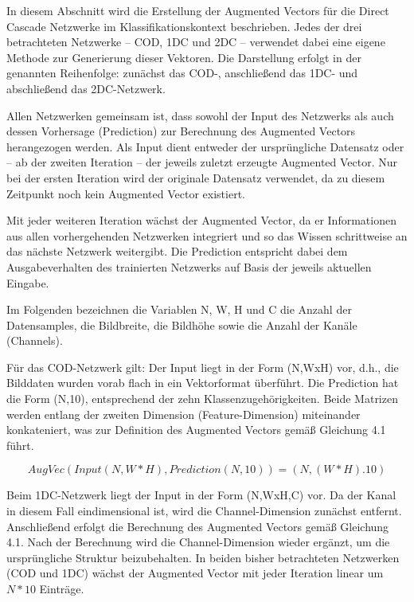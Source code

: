 In diesem Abschnitt wird die Erstellung der Augmented Vectors für die Direct Cascade Netzwerke im Klassifikationskontext beschrieben. Jedes der 
drei betrachteten Netzwerke – COD, 1DC und 2DC – verwendet dabei eine eigene Methode zur Generierung dieser Vektoren. Die Darstellung erfolgt in 
der genannten Reihenfolge: zunächst das COD-, anschließend das 1DC- und abschließend das 2DC-Netzwerk.

Allen Netzwerken gemeinsam ist, dass sowohl der Input des Netzwerks als auch dessen Vorhersage (Prediction) zur Berechnung des Augmented Vectors 
herangezogen werden. Als Input dient entweder der ursprüngliche Datensatz oder – ab der zweiten Iteration – der jeweils zuletzt erzeugte Augmented 
Vector. Nur bei der ersten Iteration wird der originale Datensatz verwendet, da zu diesem Zeitpunkt noch kein Augmented Vector existiert.

Mit jeder weiteren Iteration wächst der Augmented Vector, da er Informationen aus allen vorhergehenden Netzwerken integriert und so das Wissen 
schrittweise an das nächste Netzwerk weitergibt. Die Prediction entspricht dabei dem Ausgabeverhalten des trainierten Netzwerks auf Basis der 
jeweils aktuellen Eingabe.

Im Folgenden bezeichnen die Variablen N, W, H und C die Anzahl der Datensamples, die Bildbreite, die Bildhöhe sowie die Anzahl der Kanäle 
(Channels).

Für das COD-Netzwerk gilt: Der Input liegt in der Form (N,WxH) vor, d.h., die Bilddaten wurden vorab flach in ein Vektorformat 
überführt. Die Prediction hat die Form (N,10), entsprechend der zehn Klassenzugehörigkeiten. Beide Matrizen werden entlang der zweiten 
Dimension (Feature-Dimension) miteinander konkateniert, was zur Definition des Augmented Vectors gemäß Gleichung 4.1 führt.

\begin{equation}
    AugVec(Input(N, W*H), Prediction(N, 10)) = (N, (W*H).10)
\end{equation}

Beim 1DC-Netzwerk liegt der Input in der Form (N,WxH,C) vor. Da der Kanal in diesem Fall eindimensional ist, wird die Channel-Dimension 
zunächst entfernt. Anschließend erfolgt die Berechnung des Augmented Vectors gemäß Gleichung 4.1. Nach der Berechnung wird die Channel-Dimension 
wieder ergänzt, um die ursprüngliche Struktur beizubehalten. In beiden bisher betrachteten Netzwerken (COD und 1DC) wächst der Augmented Vector 
mit jeder Iteration linear um $N * 10$ Einträge.


